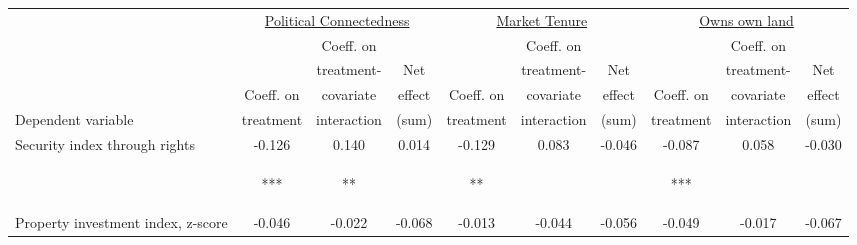 \begin{tabular}{lccccccccc}
\hline \noalign{\smallskip} & \multicolumn{3}{c}{\uline{\hfill Political Connectedness \hfill}} & \multicolumn{3}{c}{\uline{\hfill Market Tenure \hfill}} & \multicolumn{3}{c}{\uline{\hfill Owns own land \hfill}}\\
 &  & Coeff. on &  &  & Coeff. on &  &  & Coeff. on & \\
 &  & treatment- & Net &  & treatment- & Net &  & treatment- & Net\\
 & Coeff. on & covariate & effect & Coeff. on & covariate & effect & Coeff. on & covariate & effect\\
Dependent variable & treatment & interaction & (sum) & treatment & interaction & (sum) & treatment & interaction & (sum)\\
\noalign{\smallskip}\hline \noalign{\smallskip}Security index through rights & -0.126 & 0.140 & 0.014 & -0.129 & 0.083 & -0.046 & -0.087 & 0.058 & -0.030\\
 & \begin{footnotesize}[0.037]***\end{footnotesize} & \begin{footnotesize}[0.058]**\end{footnotesize} & \begin{footnotesize}[0.047]\end{footnotesize} & \begin{footnotesize}[0.063]**\end{footnotesize} & \begin{footnotesize}[0.067]\end{footnotesize} & \begin{footnotesize}[0.031]\end{footnotesize} & \begin{footnotesize}[0.031]***\end{footnotesize} & \begin{footnotesize}[0.076]\end{footnotesize} & \begin{footnotesize}[0.072]\end{footnotesize}\\
\noalign{\smallskip}Property investment index, z-score & -0.046 & -0.022 & -0.068 & -0.013 & -0.044 & -0.056 & -0.049 & -0.017 & -0.067\\

\end{tabular}
